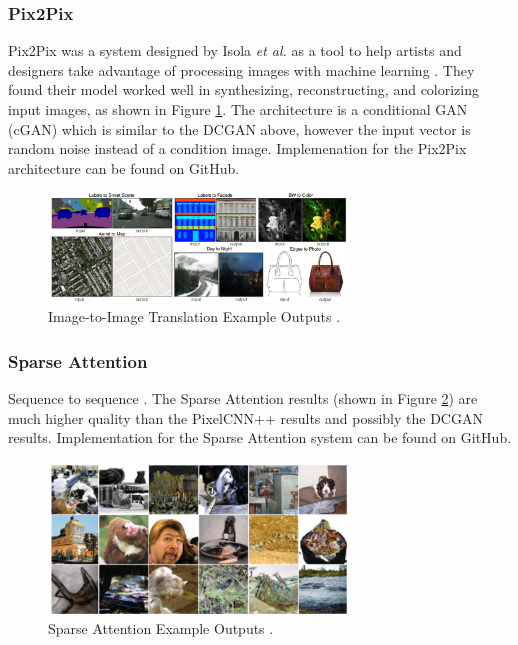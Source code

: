 \documentclass[letterpaper]{article} %
\begin{document}
\subsubsection{Pix2Pix}
Pix2Pix was a system designed by Isola \textit{et al.} 
as a tool to help artists and designers take advantage of processing images with machine learning
\cite{image_to_image}.
They found their model worked well in synthesizing, reconstructing, and colorizing
input images, as shown in Figure \ref{fig:image_to_image}.
The architecture is a conditional GAN (cGAN) which is similar to the DCGAN above, however
the input vector is random noise instead of a condition image.
Implemenation for the Pix2Pix architecture can be found on GitHub.

\begin{figure}[htbp]
\centerline{\includegraphics[width=8cm]{image_to_image.png}}
\caption{Image-to-Image Translation Example Outputs \cite{image_to_image}.}
\label{fig:image_to_image}
\end{figure}

\subsubsection{Sparse Attention}
Sequence to sequence \cite{generative_transformers}.
The Sparse Attention results (shown in Figure \ref{fig:sparse_attention}) are
much higher quality than the PixelCNN++ results and possibly
the DCGAN results.
Implementation for the Sparse Attention system can be found on GitHub.

\begin{figure}[htbp]
\centerline{\includegraphics[width=8cm]{sparse_attention.png}}
\caption{Sparse Attention Example Outputs \cite{generative_transformers}.}
\label{fig:sparse_attention}
\end{figure}
\end{document}
